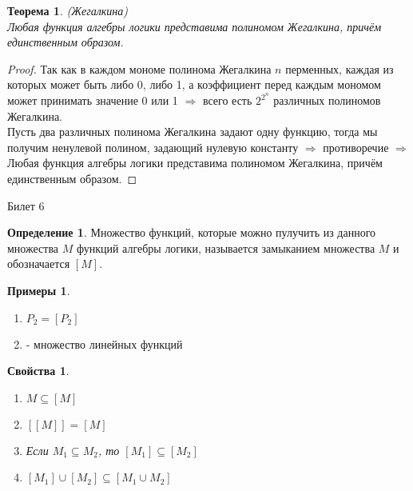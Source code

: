 \documentclass[a4paper, 12pt]{article}
\theoremstyle{definition}
\newtheorem*{definition}{Определение}
\newtheorem*{example}{Примеры}
\theoremstyle{plain}
\newtheorem*{theorem}{Теорема}
\newtheorem*{properties}{Свойства}
\theoremstyle{remark}
\begin{document}
  \begin{theorem}(Жегалкина)\\
    Любая функция алгебры логики представима полиномом Жегалкина, причём единственным образом.
  \end{theorem}
  \begin{proof}
    Так как в каждом мономе полинома Жегалкина $n$ перменных, каждая из которых может быть либо 0, либо 1, а коэффициент перед каждым мономом может принимать значение 0 или 1 $\Longrightarrow$ всего есть $2^{2^n}$ различных полиномов Жегалкина.\\
    Пусть два различных полинома Жегалкина задают одну функцию, тогда мы получим ненулевой полином, задающий нулевую константу $\Longrightarrow$ противоречие $\Longrightarrow$  Любая функция алгебры логики представима полиномом Жегалкина, причём единственным образом.
  \end{proof}
  \begin{center}
    Билет 6
  \end{center}
  \begin{definition}
    Множество функций, которые можно пулучить из данного множества $M$ функций алгебры логики, называется замыканием множества $M$ и обозначается $[M]$.
  \end{definition}
  \begin{example}
    \begin{enumerate}
      \item $P_2=[P_2]$
      \item [{1, $x+y$}] - множество линейных функций
    \end{enumerate}
  \end{example}
  \begin{properties}
    \begin{enumerate}
      \item $M\subseteq[M]$
      \item $[[M]]=[M]$
      \item Если $M_1\subseteq M_2$, то $[M_1]\subseteq[M_2]$
      \item $[M_1]\cup[M_2]\subseteq[M_1\cup M_2]$
    \end{enumerate}
  \end{properties}
\end{document}
